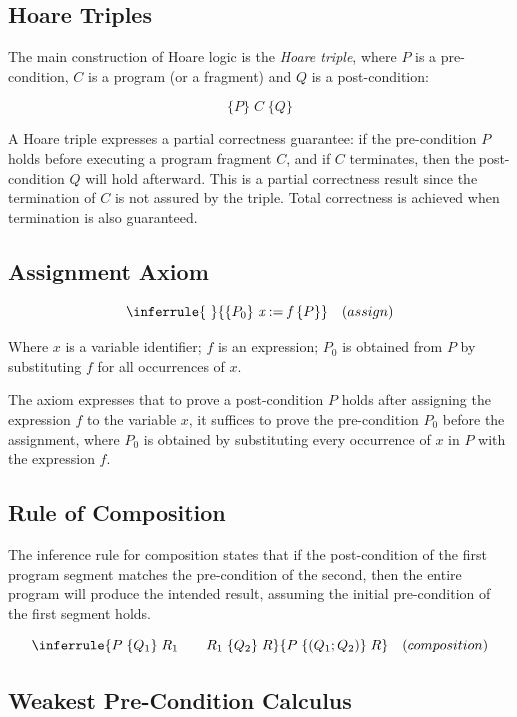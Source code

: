 \subsection{Hoare Triples}

The main construction of Hoare logic is the \textit{Hoare triple}, where $P$ is a pre-condition, $C$ is a program (or a fragment)
and $Q$ is a post-condition:

\[ 
  \{P\}\; C \;\{Q\}
\]

A Hoare triple expresses a partial correctness guarantee: if the pre-condition $P$ holds before executing a program fragment 
$C$, and if $C$ terminates, then the post-condition $Q$ will hold afterward. This is a partial correctness result since the 
termination of $C$ is not assured by the triple. Total correctness is achieved when termination is also guaranteed.

\subsection{Assignment Axiom}

\[ 
  \inferrule
  { \ }
  {\{P_0\} \ \textit{x} := \textit{f} \ \{P\}}
  \quad (assign)
\]

Where $x$ is a variable identifier; $f$ is an expression; $P_0$ is obtained from $P$ by substituting $f$ for all occurrences 
of $x$.

The axiom expresses that to prove a post-condition $P$ holds after assigning the expression $f$ to the variable $x$,
it suffices to prove the pre-condition $P_0$ before the assignment, where $P_0$ is obtained by substituting every occurrence of
$x$ in $P$ with the expression $f$.

\subsection{Rule of Composition}

The inference rule for composition states that if the post-condition of the first program segment matches the pre-condition 
of the second, then the entire program will produce the intended result, assuming the initial pre-condition of the first 
segment holds.

\[ 
  \inferrule
  {P\; \{ Q_1 \} \;R_1 \quad \quad  R_1\; \{ Q_2 \} \;R}
  {P\; \{ (Q_1 ; Q_2) \} \;R} 
  \quad (composition)
\]

\subsection{Weakest Pre-Condition Calculus}

